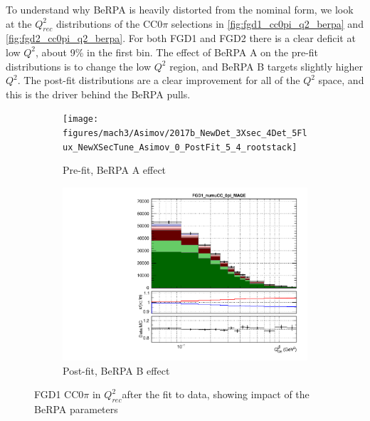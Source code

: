 To understand why BeRPA is heavily distorted from the nominal form, we look at the $Q^2_{rec}$ distributions of the CC0$\pi$ selections in \autoref{fig:fgd1_cc0pi_q2_berpa} and \autoref{fig:fgd2_cc0pi_q2_berpa}. For both FGD1 and FGD2 there is a clear deficit at low $Q^2$, about 9\% in the first bin. The effect of BeRPA A on the pre-fit distributions is to change the low $Q^2$ region, and BeRPA B targets slightly higher $Q^2$. The post-fit distributions are a clear improvement for all of the $Q^2$ space, and this is the driver behind the BeRPA pulls.
\begin{figure}[h]
		\begin{subfigure}[t]{0.49\textwidth}
			\texttt{[image: figures/mach3/Asimov/2017b\_NewDet\_3Xsec\_4Det\_5Flux\_NewXSecTune\_Asimov\_0\_PostFit\_5\_4\_rootstack]}
			\caption{Pre-fit, BeRPA A effect}
		\end{subfigure}
		\begin{subfigure}[t]{0.49\textwidth}
			\includegraphics[width=\textwidth, trim={0mm 0mm 0mm 6mm}, clip,page=15]{figures/mach3/data/postfit/2017b_NewData_NewDet_UpdXsecStep_2Xsec_4Det_5Flux_0_PostFit_5_4_rootstack}
			\caption{Post-fit, BeRPA B effect}
		\end{subfigure}
		\caption{FGD1 CC$0\pi$ in $Q^2_{rec}$after the fit to data, showing impact of the BeRPA parameters}
		\label{fig:fgd1_cc0pi_q2_berpa}
\end{figure}

